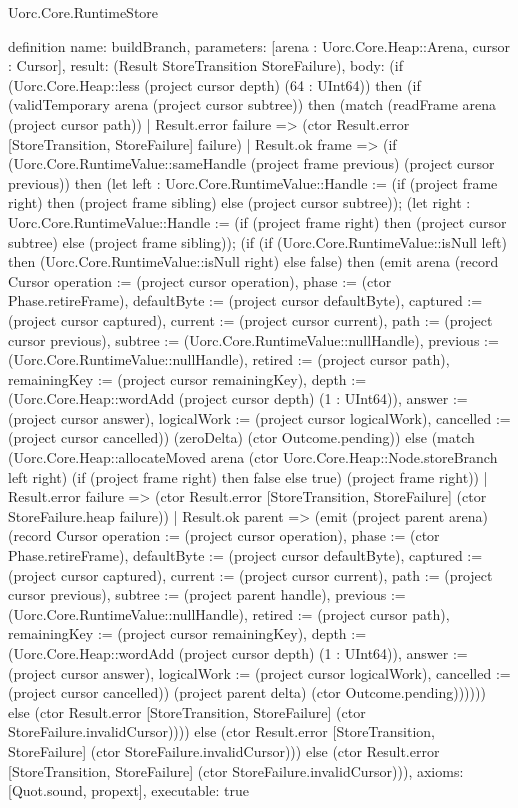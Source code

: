 \begin{lexlean}{Uorc.Core.RuntimeStore}
\begin{semanticmodule}
definition{
  name: buildBranch,
  parameters: [arena : Uorc.Core.Heap::Arena, cursor : Cursor],
  result: (Result StoreTransition StoreFailure),
  body: (if (Uorc.Core.Heap::less (project cursor depth) (64 : UInt64)) then (if (validTemporary arena (project cursor subtree)) then (match (readFrame arena (project cursor path))
    | Result.error failure => (ctor Result.error [StoreTransition, StoreFailure] failure)
    | Result.ok frame => (if (Uorc.Core.RuntimeValue::sameHandle (project frame previous) (project cursor previous)) then (let left : Uorc.Core.RuntimeValue::Handle := (if (project frame right) then (project frame sibling) else (project cursor subtree)); (let right : Uorc.Core.RuntimeValue::Handle := (if (project frame right) then (project cursor subtree) else (project frame sibling)); (if (if (Uorc.Core.RuntimeValue::isNull left) then (Uorc.Core.RuntimeValue::isNull right) else false) then (emit arena (record Cursor {operation := (project cursor operation), phase := (ctor Phase.retireFrame), defaultByte := (project cursor defaultByte), captured := (project cursor captured), current := (project cursor current), path := (project cursor previous), subtree := (Uorc.Core.RuntimeValue::nullHandle), previous := (Uorc.Core.RuntimeValue::nullHandle), retired := (project cursor path), remainingKey := (project cursor remainingKey), depth := (Uorc.Core.Heap::wordAdd (project cursor depth) (1 : UInt64)), answer := (project cursor answer), logicalWork := (project cursor logicalWork), cancelled := (project cursor cancelled)}) (zeroDelta) (ctor Outcome.pending)) else (match (Uorc.Core.Heap::allocateMoved arena (ctor Uorc.Core.Heap::Node.storeBranch left right) (if (project frame right) then false else true) (project frame right))
      | Result.error failure => (ctor Result.error [StoreTransition, StoreFailure] (ctor StoreFailure.heap failure))
      | Result.ok parent => (emit (project parent arena) (record Cursor {operation := (project cursor operation), phase := (ctor Phase.retireFrame), defaultByte := (project cursor defaultByte), captured := (project cursor captured), current := (project cursor current), path := (project cursor previous), subtree := (project parent handle), previous := (Uorc.Core.RuntimeValue::nullHandle), retired := (project cursor path), remainingKey := (project cursor remainingKey), depth := (Uorc.Core.Heap::wordAdd (project cursor depth) (1 : UInt64)), answer := (project cursor answer), logicalWork := (project cursor logicalWork), cancelled := (project cursor cancelled)}) (project parent delta) (ctor Outcome.pending)))))) else (ctor Result.error [StoreTransition, StoreFailure] (ctor StoreFailure.invalidCursor)))) else (ctor Result.error [StoreTransition, StoreFailure] (ctor StoreFailure.invalidCursor))) else (ctor Result.error [StoreTransition, StoreFailure] (ctor StoreFailure.invalidCursor))),
  axioms: [Quot.sound, propext],
  executable: true
}


\end{semanticmodule}
\end{lexlean}
